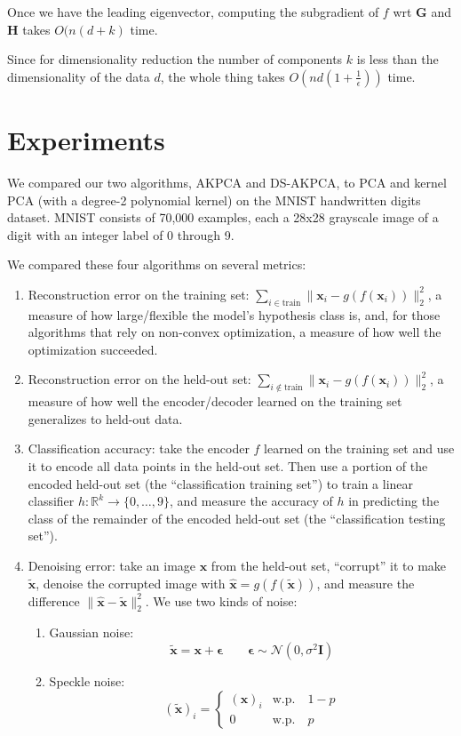 \documentclass[]{article}
\newcommand{\reals}{\mathbb{R}}
\begin{document}
Once we have the leading eigenvector, computing the subgradient of $f$ wrt $\mathbf{G}$ and $\mathbf{H}$ takes $O(n(d + k)$ time.

Since for dimensionality reduction the number of components $k$ is less than the dimensionality of the data $d$, the whole thing takes $O(nd(1 + \frac{1}{\epsilon}))$ time.

\section{Experiments}

We compared our two algorithms, AKPCA and DS-AKPCA, to PCA and kernel PCA (with a degree-2 polynomial kernel) on the MNIST handwritten digits dataset.
MNIST consists of 70,000 examples, each a 28x28 grayscale image of a digit with an integer label of 0 through 9.

We compared these four algorithms on several metrics: 
\begin{enumerate}
\item
Reconstruction error on the training set: $\sum_{i \in \text{train}} \| \mathbf{x}_i - g(f(\mathbf{x}_i)) \|_2^2$,
a measure of how large/flexible the model's hypothesis class is, and, for those algorithms that rely on non-convex optimization, a measure of how well the optimization succeeded.
\item
Reconstruction error on the held-out set:  $\sum_{i \not \in \text{train}} \| \mathbf{x}_i - g(f(\mathbf{x}_i)) \|_2^2$, a measure of how well the encoder/decoder learned on the training set generalizes to held-out data.
\item
Classification accuracy: take the encoder $f$ learned on the training set and use it to encode all data points in the held-out set.
Then use a portion of the encoded held-out set (the ``classification training set'') to train a linear classifier $h: \reals^k \to \{0, \hdots, 9\}$, and measure the accuracy of $h$ in predicting the class of the remainder of the encoded held-out set (the ``classification testing set'').
\item
Denoising error: take an image $\mathbf{x}$ from the held-out set, ``corrupt'' it to make $\tilde{\mathbf{x}}$, denoise the corrupted image with $\hat{\mathbf{x}} = g(f(\tilde{\mathbf{x}}))$, and measure the difference $\| \mathbf{\hat{x}} - \mathbf{\tilde{x}} \|^2_2$.
We use two kinds of noise:
\begin{enumerate}
\item
Gaussian noise: 
$$ \tilde{\mathbf{x}} = \mathbf{x} + \boldsymbol{\epsilon} \quad \quad \boldsymbol{\epsilon} \sim \mathcal{N}(0, \sigma^2 \mathbf{I}) $$
\item
Speckle noise:
$$ (\tilde{\mathbf{x}})_{i} = \begin{cases}
(\mathbf{x})_i &\text{w.p.} \quad 1 - p \\
0 &\text{w.p.} \quad p
\end{cases}  $$
\end{enumerate}
\end{enumerate}
\end{document}
